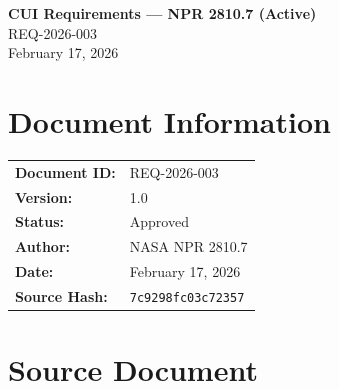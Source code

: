 \documentclass[11pt,letterpaper]{article}
\newcommand{\UniqueID}{REQ-2026-003}
\newcommand{\DocumentDate}{February 17, 2026}
\newcommand{\AuthorName}{NASA NPR 2810.7}
\newcommand{\DocumentTitle}{CUI Requirements --- NPR 2810.7 (Active)}
\begin{document}
\begin{center}
\Large\textbf{\DocumentTitle}\\[6pt]
\large\UniqueID\\[12pt]
\normalsize\DocumentDate
\end{center}

\vspace{0.25in}

\section*{Document Information}

\begin{tabular}{@{}ll@{}}
\textbf{Document ID:} & \UniqueID \\
\textbf{Version:} & 1.0 \\
\textbf{Status:} & Approved \\
\textbf{Author:} & \AuthorName \\
\textbf{Date:} & \DocumentDate \\
\textbf{Source Hash:} & \texttt{7c9298fc03c72357} \\
\end{tabular}

\vspace{0.15in}

\tableofcontents
\newpage


\section{Source Document}

\begin{center}
\end{center}

\vspace{12pt}
\end{document}
